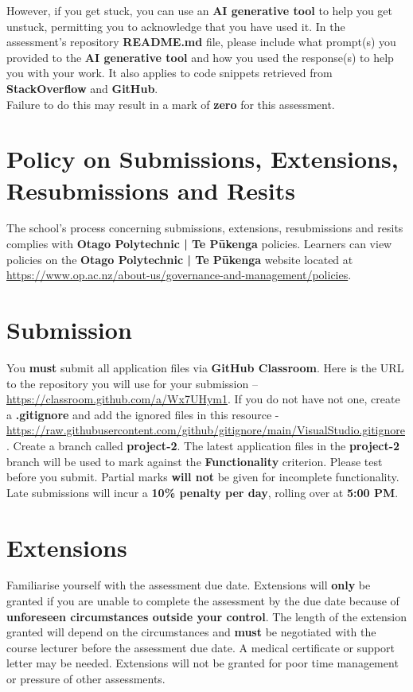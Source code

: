 \documentclass{article}
\begin{document}
 However, if you get stuck, you can use an \textbf{AI generative tool} to help you get unstuck, permitting you to acknowledge that you have used it. In the assessment's repository \textbf{README.md} file, please include what prompt(s) you provided to the \textbf{AI generative tool} and how you used the response(s) to help you with your work. It also applies to code snippets retrieved from \textbf{StackOverflow} and \textbf{GitHub}. \\
 
 Failure to do this may result in a mark of \textbf{zero} for this assessment.

\section*{Policy on Submissions, Extensions, Resubmissions and Resits}
The school's process concerning submissions, extensions, resubmissions and resits complies with \textbf{Otago Polytechnic | Te Pūkenga} policies. Learners can view policies on the \textbf{Otago Polytechnic | Te Pūkenga} website located at \href{https://www.op.ac.nz/about-us/governance-and-management/policies}{https://www.op.ac.nz/about-us/governance-and-management/policies}.

\section*{Submission}
You \textbf{must} submit all application files via \textbf{GitHub Classroom}. Here is the URL to the repository you will use for your submission – \href{https://classroom.github.com/a/Wx7UHym1}{https://classroom.github.com/a/Wx7UHym1}. If you do not have not one, create a \textbf{.gitignore} and add the ignored files in this resource - \href{https://raw.githubusercontent.com/github/gitignore/main/VisualStudio.gitignore}{https://raw.githubusercontent.com/github/gitignore/main/VisualStudio.gitignore}. Create a branch called \textbf{project-2}. The latest application files in the \textbf{project-2} branch will be used to mark against the \textbf{Functionality} criterion. Please test before you submit. Partial marks \textbf{will not} be given for incomplete functionality. Late submissions will incur a \textbf{10\% penalty per day}, rolling over at \textbf{5:00 PM}.

\section*{Extensions}
Familiarise yourself with the assessment due date. Extensions will \textbf{only} be granted if you are unable to complete the assessment by the due date because of \textbf{unforeseen circumstances outside your control}. The length of the extension granted will depend on the circumstances and \textbf{must} be negotiated with the course lecturer before the assessment due date. A medical certificate or support letter may be needed. Extensions will not be granted for poor time management or pressure of other assessments.
\end{document}
